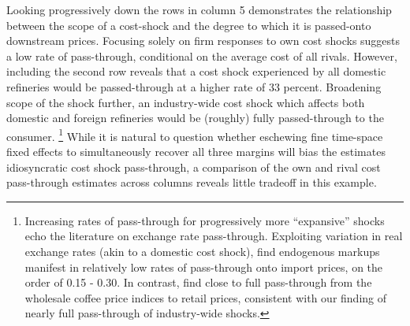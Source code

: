 \documentclass[12pt]{article}
\begin{document}
Looking progressively down the rows in column 5 demonstrates the relationship between the scope of a cost-shock and the degree to which it is passed-onto downstream prices. Focusing solely on firm responses to own cost shocks suggests a low rate of pass-through, conditional on the average cost of all rivals. However, including the second row reveals that a cost shock experienced by all domestic refineries would be passed-through at a higher rate of 33 percent. Broadening scope of the shock further, an industry-wide cost shock which affects both domestic and foreign refineries would be (roughly) fully passed-through to the consumer. \footnote{Increasing rates of pass-through for progressively more ``expansive'' shocks echo the literature on exchange rate pass-through.  Exploiting variation in real exchange rates (akin to a domestic cost shock), \citet{gopinath2008sticky,fitzgerald2013pricing,auer2016market} find endogenous markups manifest in relatively low rates of pass-through onto import prices, on the order of 0.15 - 0.30. In contrast, \citet{nakamura_accounting_2010} find close to full pass-through from the wholesale coffee price indices to retail prices, consistent with our finding of nearly full pass-through of industry-wide shocks.} While it is natural to question whether eschewing fine time-space fixed effects to simultaneously recover all three margins will bias the estimates idiosyncratic cost shock pass-through, a comparison of the own and rival cost pass-through estimates across columns reveals little tradeoff in this example.
\end{document}
